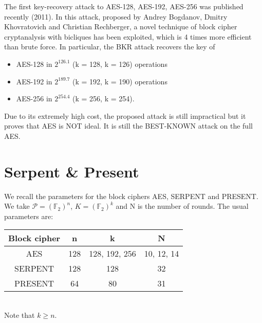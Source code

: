 \documentclass[a4paper, 10pt, titlepage]{article}
\begin{document}
The first key-recovery attack to AES-128, AES-192, AES-256 was published recently (2011).
In this attack, proposed by Andrey Bogdanov, Dmitry Khovratovich and Christian Rechberger, a novel technique of block cipher cryptanalysis with bicliques has been exploited, which is 4 times more efficient than brute force.
In particular, the BKR attack recovers the key of
\begin{itemize}
\item AES-128 in $2^{126.1}$ (k = 128, k = 126) operations
\item AES-192 in $2^{189.7}$ (k = 192, k = 190) operations
\item AES-256 in $2^{254.4}$ (k = 256, k = 254).
\end{itemize}	
Due to its extremely high cost, the proposed attack is still impractical but it proves that AES is NOT ideal. It is still the BEST-KNOWN attack on the full AES.

\newpage
\section{Serpent \& Present}
We recall the parameters for the block ciphers AES, SERPENT and PRESENT. We take $\mathcal{P} = (\mathbb{F}_2)^n$, $K = (\mathbb{F}_2)^k$ and N is the number of rounds.
The usual parameters are: \medskip \\
\begin{tabular}{|c|c|c|c|} \hline
Block cipher & n & k & N \\ \hline
AES & 128 & 128, 192, 256 & 10, 12, 14 \\
SERPENT & 128 & 128 & 32 \\
PRESENT & 64 & 80 & 31 \\ \hline
\end{tabular} \medskip \\ 
Note that $k \geq n$.
\end{document}
